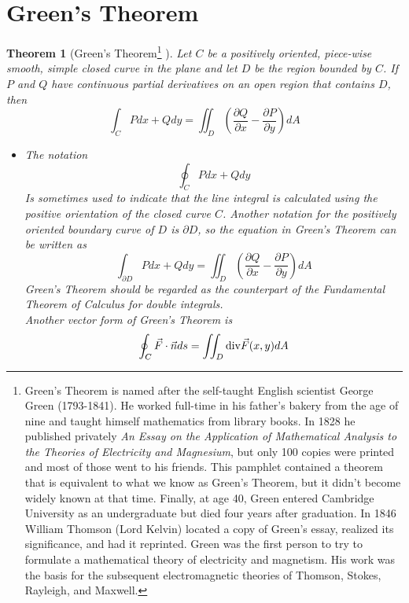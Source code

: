 \documentclass[10pt]{report}
\newtheorem{thm2}{Theorem}[section]
\newcommand{\diverg}{\textup{div}}
\begin{document}
\section{Green's Theorem}
\begin{thm2}[Green's Theorem\footnote{Green's Theorem is named after the self-taught English scientist George Green (1793-1841). He worked full-time in his father's bakery from the age of nine and taught himself mathematics from library books. In 1828 he published privately \textit{An Essay on the Application of Mathematical Analysis to the Theories of Electricity and Magnesium}, but only 100 copies were printed and most of those went to his friends. This pamphlet contained a theorem that is equivalent to what we know as Green's Theorem, but it didn't become widely known at that time. Finally, at age 40, Green entered Cambridge University as an undergraduate but died four years after graduation. In 1846 William Thomson (Lord Kelvin) located a copy of Green's essay, realized its significance, and had it reprinted. Green was the first person to try to formulate a mathematical theory of electricity and magnetism. His work was the basis for the subsequent electromagnetic theories of Thomson, Stokes, Rayleigh, and Maxwell.} ]
Let $C$ be a positively oriented, piece-wise smooth, simple closed curve in the plane and let $D$ be the region bounded by $C$. If $P$ and $Q$ have continuous partial derivatives on an open region that contains $D$, then
$$\int_C Pdx + Qdy = \iint_D\left( \frac{\partial Q}{\partial x} - \frac{\partial P}{\partial y}\right)dA$$
\begin{itemize}
\item[Note:] The notation
$$\oint_C Pdx+Qdy$$
Is sometimes used to indicate that the line integral is calculated using the positive orientation of the closed curve $C$. Another notation for the positively oriented boundary curve of $D$ is $\partial D$, so the equation in Green's Theorem can be written as
$$\int_{\partial D} Pdx + Qdy = \iint_D\left( \frac{\partial Q}{\partial x} - \frac{\partial P}{\partial y}\right)dA$$
Green's Theorem should be regarded as the counterpart of the Fundamental Theorem of Calculus for double integrals.\\
Another vector form of Green's Theorem is
$$\oint_C \vec{F}\cdot \vec{n}ds = \iint_D \diverg\vec{F}(x,y)dA$$
\end{itemize}
\end{thm2}
\end{document}
